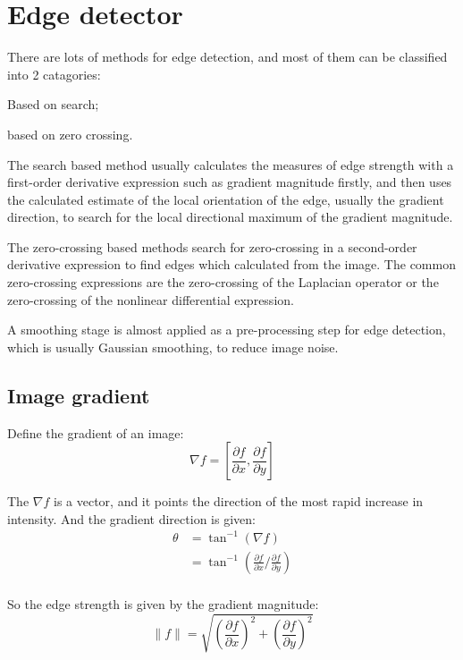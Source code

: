 \documentclass[10pt,twocolumn,letterpaper]{article}
\begin{document}
\section{Edge detector}

There are lots of methods for edge detection, and most of them can be classified 
into 2 catagories: 
\begin{enumerate*}[label={\alph*)}]
\item Based on search;
\item based on zero crossing.
\end{enumerate*}

The search based method usually calculates the measures of edge strength with a 
first-order derivative expression such as gradient magnitude firstly, and then 
uses the calculated estimate of the local orientation of the edge, usually the gradient 
direction, to search for the local directional maximum of the gradient magnitude. 
\cite{ref3}

The zero-crossing based methods search for zero-crossing in a second-order derivative 
expression to find edges which calculated from the image. The common zero-crossing 
expressions are the zero-crossing of the Laplacian operator or the zero-crossing of 
the nonlinear differential expression.

A smoothing stage is almost applied as a pre-processing step for edge detection, which 
is usually Gaussian smoothing, to reduce image noise.

\subsection{Image gradient}

Define the gradient of an image:
$$
\nabla f = [ \frac{\partial f}{\partial x}, \frac{\partial f}{\partial y} ]
$$

The $\nabla f$ is a vector, and it points the direction of the most rapid increase in intensity. 
And the gradient direction is given:
$$
\begin{aligned}
\theta & = \tan^{-1}{(\nabla f)} \\
       & = \tan^{-1}{(\frac{\partial f}{\partial x} / \frac{\partial f}{\partial y})} \\
\end{aligned}
$$

So the edge strength is given by the gradient magnitude:
$$
\parallel f \parallel = \sqrt{(\frac{\partial f}{\partial x})^{2} + (\frac{\partial f}{\partial y})^{2}} 
$$
\end{document}
